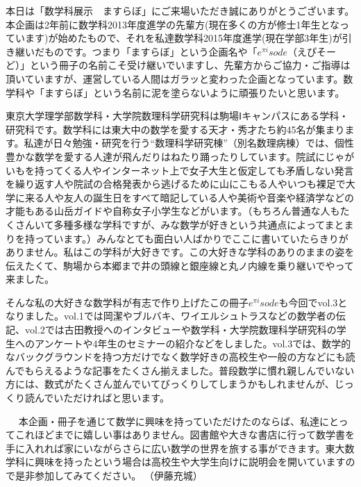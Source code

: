 本日は「数学科展示　ますらぼ」にご来場いただき誠にありがとうございます。本企画は2年前に数学科2013年度進学の先輩方(現在多くの方が修士1年生となっています)が始めたもので、それを私達数学科2015年度進学(現在学部3年生)が引き継いだものです。つまり「ますらぼ」という企画名や「$e^{\pi i}sode$（えぴそーど）」という冊子の名前こそ受け継いでいますし、先輩方からご協力・ご指導は頂いていますが、運営している人間はガラッと変わった企画となっています。数学科や「ますらぼ」という名前に泥を塗らないように頑張りたいと思います。\par
東京大学理学部数学科・大学院数理科学研究科は駒場Ⅰキャンパスにある学科・研究科です。数学科には東大中の数学を愛する天才・秀才たち約45名が集まります。私達が日々勉強・研究を行う``数理科学研究棟''（別名数理病棟）では、個性豊かな数学を愛する人達が飛んだりはねたり踊ったりしています。院試にじゃがいもを持ってくる人やインターネット上で女子大生と仮定しても矛盾しない発言を繰り返す人や院試の合格発表から逃げるために山にこもる人やいつも裸足で大学に来る人や友人の誕生日をすべて暗記している人や美術や音楽や経済学などの才能もある山岳ガイドや自称女子小学生などがいます。（もちろん普通な人もたくさんいて多種多様な学科ですが、みな数学が好きという共通点によってまとまりを持っています。）みんなとても面白い人ばかりでここに書いていたらきりがありません。私はこの学科が大好きです。この大好きな学科のありのままの姿を伝えたくて、駒場から本郷まで井の頭線と銀座線と丸ノ内線を乗り継いでやって来ました。\par
そんな私の大好きな数学科が有志で作り上げたこの冊子$e^{\pi i}sode$も今回でvol.3となりました。vol.1では岡潔やブルバキ、ワイエルシュトラスなどの数学者の伝記、vol.2では古田教授へのインタビューや数学科・大学院数理科学研究科の学生へのアンケートや4年生のセミナーの紹介などをしました。vol.3では、数学的なバックグラウンドを持つ方だけでなく数学好きの高校生や一般の方などにも読んでもらえるような記事をたくさん揃えました。普段数学に慣れ親しんでいない方には、数式がたくさん並んでいてびっくりしてしまうかもしれませんが、じっくり読んでいただければと思います。\par　
本企画・冊子を通じて数学に興味を持っていただけたのならば、私達にとってこれほどまでに嬉しい事はありません。図書館や大きな書店に行って数学書を手に入れれば家にいながらさらに広い数学の世界を旅する事ができます。東大数学科に興味を持ったという場合は高校生や大学生向けに説明会を開いていますので是非参加してみてください。
（伊藤充城）
